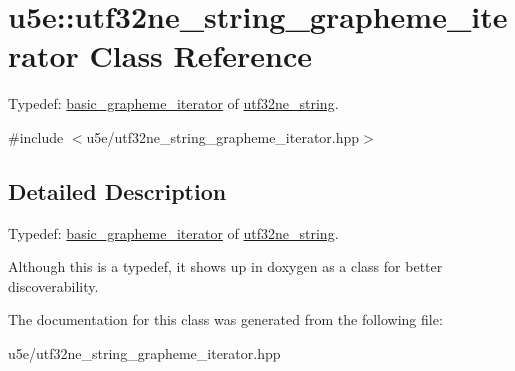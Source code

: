 \hypertarget{classu5e_1_1utf32ne__string__grapheme__iterator}{}\section{u5e\+:\+:utf32ne\+\_\+string\+\_\+grapheme\+\_\+iterator Class Reference}
\label{classu5e_1_1utf32ne__string__grapheme__iterator}


Typedef\+: \hyperlink{classu5e_1_1basic__grapheme__iterator}{basic\+\_\+grapheme\+\_\+iterator} of \hyperlink{classu5e_1_1utf32ne__string}{utf32ne\+\_\+string}.  




{\ttfamily \#include $<$u5e/utf32ne\+\_\+string\+\_\+grapheme\+\_\+iterator.\+hpp$>$}



\subsection{Detailed Description}
Typedef\+: \hyperlink{classu5e_1_1basic__grapheme__iterator}{basic\+\_\+grapheme\+\_\+iterator} of \hyperlink{classu5e_1_1utf32ne__string}{utf32ne\+\_\+string}. 

Although this is a typedef, it shows up in doxygen as a class for better discoverability. 

The documentation for this class was generated from the following file\+:\begin{DoxyCompactItemize}
\item 
u5e/utf32ne\+\_\+string\+\_\+grapheme\+\_\+iterator.\+hpp\end{DoxyCompactItemize}

